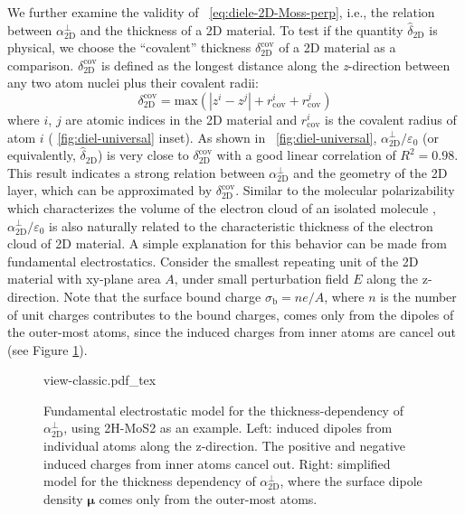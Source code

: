 We further examine the validity of ~\autoref{eq:diele-2D-Moss-perp},
i.e., the relation between $\alpha_{\mathrm{2D}}^{\perp}$ and the
thickness of a 2D material. To test if the quantity
$\hat{\delta}_{\mathrm{2D}}$ is physical, we choose the ``covalent''
thickness $\delta_{\mathrm{2D}}^{\mathrm{cov}}$ of a 2D material as a
comparison. $\delta_{\mathrm{2D}}^{\mathrm{cov}}$ is defined as the
longest distance along the \textit{z}-direction between any two atom
nuclei plus their covalent radii:
%
%
\begin{equation}
  \label{eq:diele-cov-thick}
  \delta_{\mathrm{2D}}^{\mathrm{cov}} = \mathrm{max}(|z^{i} - z^{j}|
  + r^{i}_{\mathrm{cov}} + r^{j}_{\mathrm{cov}})
\end{equation}
where $i$, $j$ are atomic indices in the 2D material and
$r_{\mathrm{cov}}^{i}$ is the covalent radius of atom $i$ (
\autoref{fig:diel-universal} inset). As shown in
~\autoref{fig:diel-universal},
$\alpha_{\mathrm{2D}}^{\perp}/\varepsilon_{0}$ (or equivalently,
$\hat{\delta}_{\mathrm{2D}}$) is very close to
$\delta_{\mathrm{2D}}^{\mathrm{cov}}$ with a good linear correlation
of $R^{2}=0.98$. This result indicates a strong relation between
$\alpha_{\mathrm{2D}}^{\perp}$ and the geometry of the 2D layer, which
can be approximated by $\delta_{\mathrm{2D}}^{\mathrm{cov}}$. Similar
to the molecular polarizability which characterizes the volume of the
electron cloud of an isolated molecule \cite{Israelachvili_2011_book},
$\alpha_{\mathrm{2D}}^{\perp}/\varepsilon_{0}$ is also naturally
related to the characteristic thickness of the electron cloud of 2D
material. A simple explanation for this behavior can be made from
fundamental electrostatics. Consider the smallest repeating unit of the 2D
material with xy-plane area $A$, under small perturbation field $E$
along the z-direction.  Note that the surface bound charge
$\sigma_{\mathrm{b}}=n e /A$, where $n$ is the number of unit charges
contributes to the bound charges, comes only from the dipoles of the
outer-most atoms, since the induced charges from inner atoms are
cancel out (see Figure \ref{fig:classic-model}).
\begin{figure}[htbp]
  \centering
  {view-classic.pdf_tex}
  \caption{Fundamental electrostatic model for the
    thickness-dependency of $\alpha_{\mathrm{2D}}^{\perp}$, using 2H-MoS2 as an
    example. Left: induced dipoles from individual atoms along the
    z-direction. The positive and negative induced charges from inner
    atoms cancel out. Right: simplified model for the thickness
    dependency of $\alpha_{\mathrm{2D}}^{\perp}$, where the surface dipole density
    $\boldsymbol{\mu}$ comes only from the outer-most atoms.}
  \label{fig:classic-model}
\end{figure}
